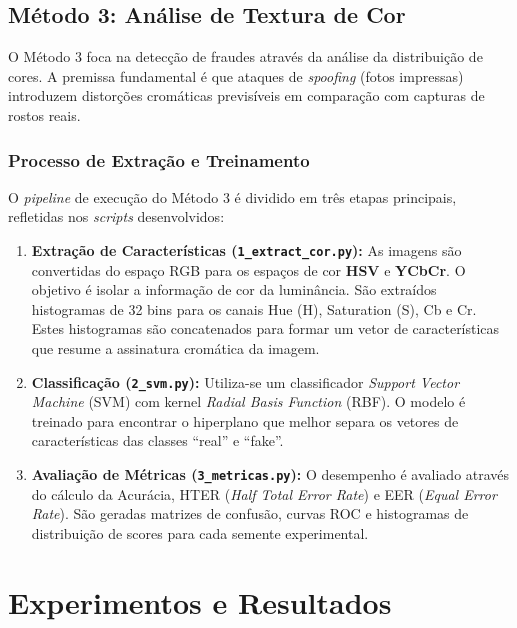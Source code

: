 \documentclass[
	article,			%
	11pt,				%
	oneside,			%
	a4paper,			%
	english,			%
	brazil,				%
	sumario=tradicional
	]{abntex2}
\begin{document}
\subsection{Método 3: Análise de Textura de Cor}
O Método 3 foca na detecção de fraudes através da análise da distribuição de cores. A premissa fundamental é que ataques de \textit{spoofing} (fotos impressas) introduzem distorções cromáticas previsíveis em comparação com capturas de rostos reais.

\subsubsection{Processo de Extração e Treinamento}
O \textit{pipeline} de execução do Método 3 é dividido em três etapas principais, refletidas nos \textit{scripts} desenvolvidos:

\begin{enumerate}
    \item \textbf{Extração de Características (\texttt{1\_extract\_cor.py}):} 
    As imagens são convertidas do espaço RGB para os espaços de cor \textbf{HSV} e \textbf{YCbCr}. O objetivo é isolar a informação de cor da luminância. São extraídos histogramas de 32 bins para os canais Hue (H), Saturation (S), Cb e Cr. Estes histogramas são concatenados para formar um vetor de características que resume a assinatura cromática da imagem.
    
    \item \textbf{Classificação (\texttt{2\_svm.py}):} 
    Utiliza-se um classificador \textit{Support Vector Machine} (SVM) com kernel \textit{Radial Basis Function} (RBF). O modelo é treinado para encontrar o hiperplano que melhor separa os vetores de características das classes ``real'' e ``fake''.
    
    \item \textbf{Avaliação de Métricas (\texttt{3\_metricas.py}):} 
    O desempenho é avaliado através do cálculo da Acurácia, HTER (\textit{Half Total Error Rate}) e EER (\textit{Equal Error Rate}). São geradas matrizes de confusão, curvas ROC e histogramas de distribuição de scores para cada semente experimental.
\end{enumerate}

\section{Experimentos e Resultados}
\end{document}
